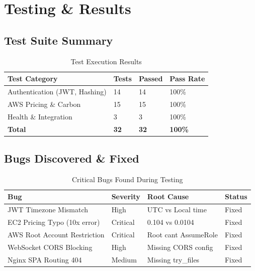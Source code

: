 \documentclass[12pt,a4paper]{report}
\begin{document}
\chapter{Testing \& Results}

\section{Test Suite Summary}

\begin{table}[H]
\centering
\caption{Test Execution Results}
\begin{tabular}{@{}llll@{}}
\toprule
\textbf{Test Category} & \textbf{Tests} & \textbf{Passed} & \textbf{Pass Rate} \\
\midrule
Authentication (JWT, Hashing) & 14 & 14 & 100\% \\
AWS Pricing \& Carbon & 15 & 15 & 100\% \\
Health \& Integration & 3 & 3 & 100\% \\
\midrule
\textbf{Total} & \textbf{32} & \textbf{32} & \textbf{100\%} \\
\bottomrule
\end{tabular}
\end{table}

\section{Bugs Discovered \& Fixed}

\begin{table}[H]
\centering
\caption{Critical Bugs Found During Testing}
\begin{tabular}{@{}llll@{}}
\toprule
\textbf{Bug} & \textbf{Severity} & \textbf{Root Cause} & \textbf{Status} \\
\midrule
JWT Timezone Mismatch & High & UTC vs Local time & Fixed \\
EC2 Pricing Typo (10x error) & Critical & 0.104 vs 0.0104 & Fixed \\
AWS Root Account Restriction & Critical & Root cant AssumeRole & Fixed \\
WebSocket CORS Blocking & High & Missing CORS config & Fixed \\
Nginx SPA Routing 404 & Medium & Missing try\_files & Fixed \\
\bottomrule
\end{tabular}
\end{table}
\end{document}
